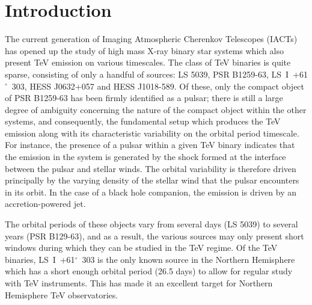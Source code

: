 \documentclass[preprint2]{aastex}
\newcommand{\lsi}{LS~I~+61$^{\circ}$~303}
\begin{document}
\keywords{}

\section{Introduction}

The current generation of Imaging Atmospheric Cherenkov Telescopes (IACTs) has opened up the study of high mass X-ray binary star systems which also present TeV emission on various timescales. The class of TeV binaries is quite sparse, consisting of only a handful of sources: LS 5039, PSR B1259-63, \lsi{}, HESS J0632+057 and HESS J1018-589. Of these, only the compact object of PSR B1259-63 has been firmly identified as a pulsar; there is still a large degree of ambiguity concerning the nature of the compact object within the other systems, and consequently, the fundamental setup which produces the TeV emission along with its characteristic variability on the orbital period timescale. For instance, the presence of a pulsar within a given TeV binary indicates that the emission in the system is generated by the shock formed at the interface between the pulsar and stellar winds. The orbital variability is therefore driven principally by the varying density of the stellar wind that the pulsar encounters in its orbit. In the case of a black hole companion, the emission is driven by an accretion-powered jet.


The orbital periods of these objects vary from several days (LS 5039) to several years (PSR B129-63), and as a result, the various sources may only present short windows during which they can be studied in the TeV regime. Of the TeV binaries, \lsi{} is the only known source in the Northern Hemisphere which has a short enough orbital period (26.5 days) to allow for regular study with TeV instruments. This has made it an excellent target for Northern Hemisphere TeV observatories. 
\end{document}
